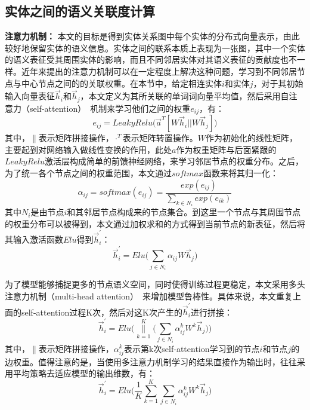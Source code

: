\subsection{实体之间的语义关联度计算}

\textbf{注意力机制：}
本文的目标是得到实体关系图中每个实体的分布式向量表示，由此较好地保留实体的语义信息。实体之间的联系本质上表现为一张图，其中一个实体的语义表征受其周围实体的影响，而且不同邻居实体对其语义表征的贡献度也不一样。近年来提出的注意力机制可以在一定程度上解决这种问题，学习到不同邻居节点与中心节点之间的的关联权重。在本节中，给定相连实体$i$和实体$j$，对于其初始输入向量表征$\vec h_i$和$\vec h_j$，本文定义为其所关联的单词词向量平均值，然后采用自注意力（self-attention）~\cite{corr/VaswaniSPUJGKP17, iclr/VelickovicCCRLB18}机制来学习他们之间的权重$e_{ij}$，有：
\begin{equation}
    e_{ij} = LeakyRelu\big(\vec a^T[W\vec h_i || W\vec h_j]\big)
    \label{gat_e_ij}
\end{equation}
\noindent 其中，$\parallel$表示矩阵拼接操作，$\cdot^T$表示矩阵转置操作。$W$作为初始化的线性矩阵，主要起到对网络输入做线性变换的作用，此处$a$作为权重矩阵与后面紧跟的$LeakyRelu$激活层构成简单的前馈神经网络，来学习邻居节点的权重分布。之后，为了统一各个节点之间的权重范围，本文通过$softmax$函数来将其归一化：
\begin{equation}
    \alpha_{ij} = softmax(e_{ij}) = \frac{exp(e_{ij})}{\sum_{k\in N_i}exp(e_{ik})}
    \label{alpha_ij}
\end{equation}
\noindent 其中$N_i$是由节点$i$和其邻居节点构成来的节点集合。到这里一个节点与其周围节点的权重分布可以被得到，本文通过加权求和的方式得到当前节点的新表征，然后将其输入激活函数$Elu$得到$\vec h_i^{'}$：
\begin{equation}
    \vec h_i^{'} = Elu\Bigg(\sum_{j \in N_i}{\alpha_{ij} W\vec h_j}\Bigg)
    \label{h_i_t}
\end{equation}

为了模型能够捕捉更多的节点语义空间，同时使得训练过程更稳定，本文采用多头注意力机制（multi-head attention）~\cite{corr/VaswaniSPUJGKP17}来增加模型鲁棒性。具体来说，本文重复上面的self-attention过程K次，然后对这K次产生的$\vec h_i^{'}$进行拼接：
\begin{equation}
    \vec h_i^{'} = Elu\Bigg(\mathop{\parallel}\limits_{k=1}^{K} \Bigg(\sum_{j \in N_i}{\alpha_{ij}^{k} W^k\vec h_j}\Bigg)\Bigg)
    \label{k_heads_1}
\end{equation}
\noindent 其中，$\parallel$表示矩阵拼接操作，$\alpha_{ij}^{k}$表示第k次self-attention学习到的节点$i$和节点$j$的边权重。值得注意的是，当使用多注意力机制学习的结果直接作为输出时，往往采用平均策略去适应模型的输出维数，有：
\begin{equation}
    \vec h_i^{'} = Elu\Bigg(\frac{1}{K}\sum_{k=1}^{K}\sum_{j \in N_i}{\alpha_{ij}^{k} W^k\vec h_j}\Bigg)
    \label{k_heads_2}
\end{equation}


